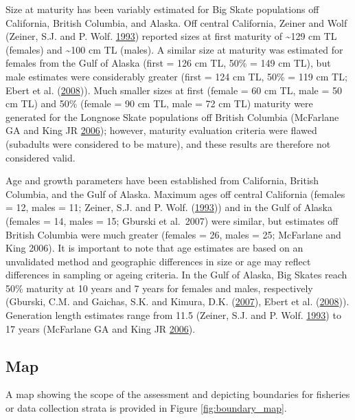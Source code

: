 \documentclass[12pt,]{article}
\begin{document}
Size at maturity has been variably estimated for Big Skate populations
off California, British Columbia, and Alaska. Off central California,
Zeiner and Wolf (Zeiner, S.J. and P. Wolf.
\protect\hyperlink{ref-ZeinerWolf1993}{1993}) reported sizes at first
maturity of \textasciitilde{}129 cm TL (females) and
\textasciitilde{}100 cm TL (males). A similar size at maturity was
estimated for females from the Gulf of Alaska (first = 126 cm TL, 50\% =
149 cm TL), but male estimates were considerably greater (first = 124 cm
TL, 50\% = 119 cm TL; Ebert et al.
(\protect\hyperlink{ref-Ebert2008}{2008})). Much smaller sizes at first
(female = 60 cm TL, male = 50 cm TL) and 50\% (female = 90 cm TL, male =
72 cm TL) maturity were generated for the Longnose Skate populations off
British Columbia (McFarlane GA and King JR
\protect\hyperlink{ref-McFandKing2006}{2006}); however, maturity
evaluation criteria were flawed (subadults were considered to be
mature), and these results are therefore not considered valid.

Age and growth parameters have been established from California, British
Columbia, and the Gulf of Alaska. Maximum ages off central California
(females = 12, males = 11; Zeiner, S.J. and P. Wolf.
(\protect\hyperlink{ref-ZeinerWolf1993}{1993})) and in the Gulf of
Alaska (females = 14, males = 15; Gburski et al.~2007) were similar, but
estimates off British Columbia were much greater (females = 26, males =
25; McFarlane and King 2006). It is important to note that age estimates
are based on an unvalidated method and geographic differences in size or
age may reflect differences in sampling or ageing criteria. In the Gulf
of Alaska, Big Skates reach 50\% maturity at 10 years and 7 years for
females and males, respectively (Gburski, C.M. and Gaichas, S.K. and
Kimura, D.K. (\protect\hyperlink{ref-Gburski2007}{2007}), Ebert et al.
(\protect\hyperlink{ref-Ebert2008}{2008})). Generation length estimates
range from 11.5 (Zeiner, S.J. and P. Wolf.
\protect\hyperlink{ref-ZeinerWolf1993}{1993}) to 17 years (McFarlane GA
and King JR \protect\hyperlink{ref-McFandKing2006}{2006}).

\hypertarget{map}{%
\subsection{Map}\label{map}}

A map showing the scope of the assessment and depicting boundaries for
fisheries or data collection strata is provided in Figure
\ref{fig:boundary_map}.
\end{document}
